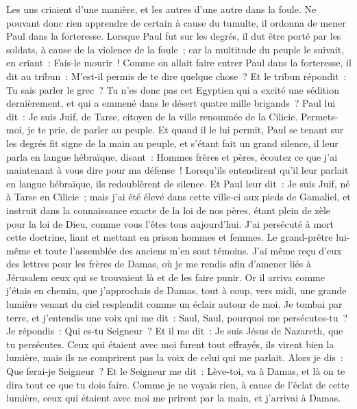 \begin{multicols}{2}
Les uns criaient d'une manière, et les autres d'une autre dans la foule. Ne pouvant donc rien apprendre de certain à cause du tumulte, il ordonna de mener Paul dans la forteresse.
Lorsque Paul fut sur les degrés, il dut être porté par les soldats, à cause de la violence de la foule~;
car la multitude du peuple le suivait, en criant~: Fais-le mourir~!
Comme on allait faire entrer Paul dans la forteresse, il dit au tribun~: M'est-il permis de te dire quelque chose~? Et le tribun répondit~: Tu sais parler le grec~?
Tu n'es donc pas cet Egyptien qui a excité une sédition dernièrement, et qui a emmené dans le désert quatre mille brigands~?
Paul lui dit~: Je suis Juif, de Tarse, citoyen de la ville renommée de la Cilicie. Permets-moi, je te prie, de parler au peuple.
Et quand il le lui permit, Paul se tenant sur les degrés fit signe de la main au peuple, et s'étant fait un grand silence, il leur parla en langue hébraïque, disant~:
\VerseOne{}Hommes frères et pères, écoutez ce que j'ai maintenant à vous dire pour ma défense~!
Lorsqu'ils entendirent qu'il leur parlait en langue hébraïque, ils redoublèrent de silence. Et Paul leur dit~:
Je suis Juif, né à Tarse en Cilicie~; mais j'ai été élevé dans cette ville-ci aux pieds de Gamaliel, et instruit dans la connaissance exacte de la loi de nos pères, étant plein de zèle pour la loi de Dieu, comme vous l'êtes tous aujourd'hui.
J'ai persécuté à mort cette doctrine, liant et mettant en prison hommes et femmes.
Le grand-prêtre lui-même et toute l'assemblée des anciens m'en sont témoins. J'ai même reçu d'eux des lettres pour les frères de Damas, où je me rendis afin d'amener liés à Jérusalem ceux qui se trouvaient là et de les faire punir.
Or il arriva comme j'étais en chemin, que j'approchais de Damas, tout à coup, vers midi, une grande lumière venant du ciel resplendit comme un éclair autour de moi.
Je tombai par terre, et j'entendis une voix qui me dit~: Saul, Saul, pourquoi me persécutes-tu~?
Je répondis~: Qui es-tu Seigneur~? Et il me dit~: Je suis Jésus de Nazareth, que tu persécutes.
Ceux qui étaient avec moi furent tout effrayés, ils virent bien la lumière, mais ils ne comprirent pas la voix de celui qui me parlait. Alors je dis~: Que ferai-je Seigneur~?
Et le Seigneur me dit~: Lève-toi, va à Damas, et là on te dira tout ce que tu dois faire.
Comme je ne voyais rien, à cause de l'éclat de cette lumière, ceux qui étaient avec moi me prirent par la main, et j'arrivai à Damas.

\end{multicols}
